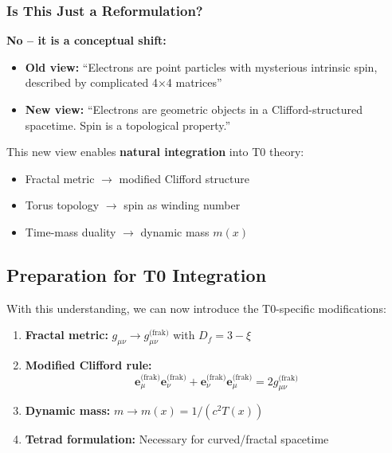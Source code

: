 \subsubsection{Is This Just a Reformulation?}

\textbf{No – it is a conceptual shift:}

\begin{itemize}
	\item \textbf{Old view:} ``Electrons are point particles with mysterious intrinsic spin, described by complicated 4×4 matrices''
	
	\item \textbf{New view:} ``Electrons are geometric objects in a Clifford-structured spacetime. Spin is a topological property.''
\end{itemize}

This new view enables \textbf{natural integration} into T0 theory:
\begin{itemize}
	\item Fractal metric $\rightarrow$ modified Clifford structure
	\item Torus topology $\rightarrow$ spin as winding number
	\item Time-mass duality $\rightarrow$ dynamic mass $m(x)$
\end{itemize}

\subsection{Preparation for T0 Integration}
\label{subsec:preparation_t0}

With this understanding, we can now introduce the T0-specific modifications:

\begin{enumerate}
	\item \textbf{Fractal metric:} $g_{\mu\nu} \rightarrow g_{\mu\nu}^{\text{(frak)}}$ with $D_f = 3 - \xi$
	
	\item \textbf{Modified Clifford rule:}
	\begin{equation}
		\mathbf{e}_\mu^{\text{(frak)}} \mathbf{e}_\nu^{\text{(frak)}} + 
		\mathbf{e}_\nu^{\text{(frak)}} \mathbf{e}_\mu^{\text{(frak)}} = 
		2 g_{\mu\nu}^{\text{(frak)}}
	\end{equation}
	
	\item \textbf{Dynamic mass:} $m \rightarrow m(x) = 1/(c^2 T(x))$
	
	\item \textbf{Tetrad formulation:} Necessary for curved/fractal spacetime
\end{enumerate}

